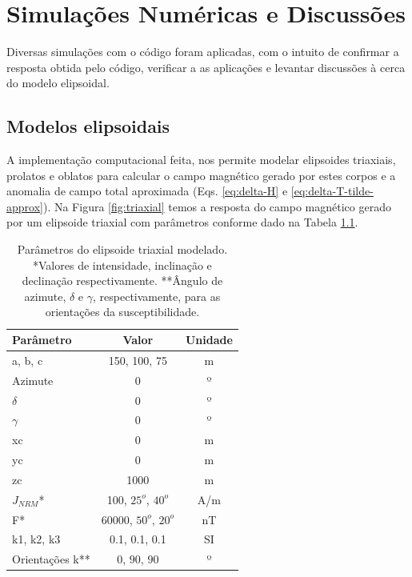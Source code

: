 \chapter{Simulações Numéricas e Discussões}

Diversas simulações com o código foram aplicadas, com o intuito de confirmar a resposta obtida pelo código, verificar a  as aplicações e levantar discussões à cerca do modelo elipsoidal.

\section{Modelos elipsoidais}

A implementação computacional feita, nos permite modelar elipsoides triaxiais, prolatos e oblatos para calcular o campo magnético gerado por estes corpos e a anomalia de campo total aproximada (Eqs. \ref{eq:delta-H} e \ref{eq:delta-T-tilde-approx}). Na Figura \ref{fig:triaxial} temos a resposta do campo magnético gerado por um elipsoide triaxial com parâmetros conforme dado na Tabela \ref{tab:triaxial}.

\begin{table}[h]
	\begin{center}
		\begin{tabular}{|l|c|c|}
			\hline
			\textbf{Parâmetro}  & \textbf{Valor}  & \textbf{Unidade} \\
			\hline 
			a, b, c   & 150, 100, 75 & m\\
			\hline
			Azimute   & $0$ & º\\
			\hline
			$\delta$ & $0$ & º\\
			\hline
			$\gamma$ & $0$  & º\\
			\hline
			xc   & 0  & m\\
			\hline          
			yc   & 0  & m\\
			\hline                
			zc   & 1000 & m\\
			\hline
			$J_{NRM}$*  & 100, $25^o$, $40^o$  & A/m\\
			\hline
			F*    & 60000, $50^o$, $20^o$ & nT\\
			\hline
			k1, k2, k3   & 0.1, 0.1, 0.1  & SI\\
			\hline
			Orientações k**   & $0$, $90$, $90$  & º\\
			\hline
		\end{tabular}
		\caption{Parâmetros do elipsoide triaxial modelado. *Valores de intensidade, inclinação e declinação respectivamente. **Ângulo de azimute, $\delta$ e $\gamma$, respectivamente, para as orientações da susceptibilidade.}
	\end{center}
	\label{tab:triaxial}
\end{table}

